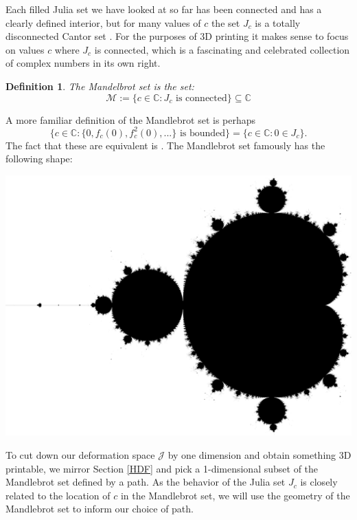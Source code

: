 \documentclass[12 pt]{article}
\newcommand{\bC}{\mathbb{C}}
\newcommand{\cJ}{\mathcal{J}}
\newcommand{\cM}{\mathcal{M}}
\newtheorem{definition}{Definition}
\begin{document}
Each filled Julia set we have looked at so far has been connected and has a clearly defined interior, but for many values of $c$ the set $J_c$ is a totally disconnected Cantor set \cite[Chapter 9]{Milnor}.  For the purposes of 3D printing it makes sense to focus on values $c$ where $J_c$ is connected, which is a fascinating and celebrated collection of complex numbers in its own right.
\begin{definition}\label{Mandlebrot}
The \textit{Mandelbrot set} is the set:
\[\cM:=\{c\in\bC: J_c\text{ is connected}\}\subseteq\bC\]
\end{definition}
A more familiar definition of the Mandlebrot set is perhaps
\[\{c\in\bC: \{0,f_c(0),f_c^2(0),...\}\text{ is bounded}\} = \{c\in\bC: 0\in J_c\}.\]
The fact that these are equivalent is \cite[Theorem 9.5, Appendix G]{Milnor}.  The Mandlebrot set famously has the following shape:
\begin{center}
    \includegraphics[width=.75\textwidth]{images/mandlebrot_cropped.png}
\end{center}
To cut down our deformation space $\cJ$ by one dimension and obtain something 3D printable, we mirror Section \ref{HDF} and pick a 1-dimensional subset of the Mandlebrot set defined by a path.  As the behavior of the Julia set $J_c$ is closely related to the location of $c$ in the Mandlebrot set, we will use the geometry of the Mandlebrot set to inform our choice of path.
\end{document}
